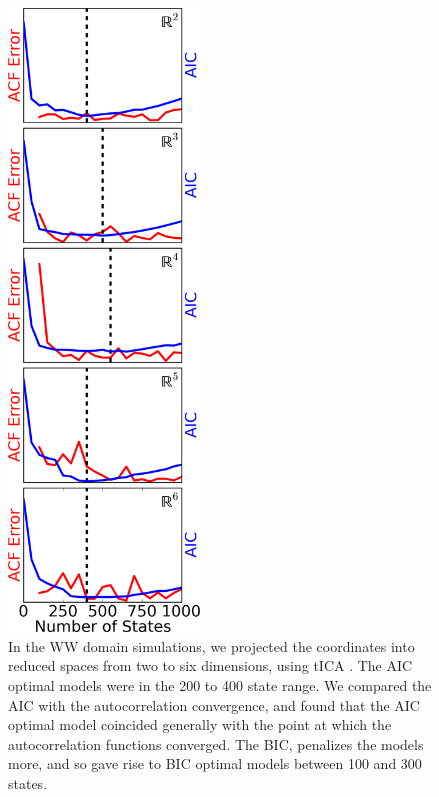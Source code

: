 \documentclass[twocolumn,floatfix,nofootinbib,aps]{revtex4-1}
\begin{document}
\begin{figure}
\centering
\includegraphics[width=2in]{figs/ww_acf_vs_aic.png}
\caption{In the WW domain simulations, we projected the coordinates into reduced spaces from two to six dimensions, using tICA \cite{Schwantes:2013..}. The AIC optimal models were in the 200 to 400 state range. We compared the AIC with the autocorrelation convergence, and found that the AIC optimal model coincided generally with the point at which the autocorrelation functions converged. The BIC, penalizes the models more, and so gave rise to BIC optimal models between 100 and 300 states.}
\end{figure}


\end{document}
